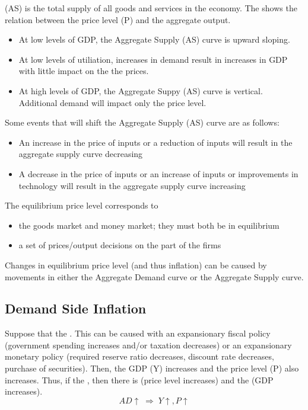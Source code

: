 \documentclass{article}
\begin{document}
 (AS) is the total supply of all goods and services in the economy. The  shows the relation between the price level (P) and the aggregate output. 
\begin{itemize}
  \item At low levels of GDP, the Aggregate Supply (AS) curve is upward sloping. 
  \item At low levels of utiliation, increases in demand result in increases in GDP with little impact on the the prices. 
  \item At high levels of GDP, the Aggregate Suppy (AS) curve is vertical. Additional demand will impact only the price level.
\end{itemize}
Some events that will shift the Aggregate Supply (AS) curve are as follows: 
\begin{itemize}
  \item An increase in the price of inputs or a reduction of inputs will result in the aggregate supply curve decreasing 
  \item A decrease in the price of inputs or an increase of inputs or improvements in technology will result in the aggregate supply curve increasing
\end{itemize}

\begin{remark}
  The equilibrium price level corresponds to 
  \begin{itemize}
    \item the goods market and money market; they must both be in equilibrium 
    \item a set of prices/output decisions on the part of the firms
  \end{itemize}
\end{remark}

Changes in equilibrium price level (and thus inflation) can be caused by movements in either the Aggregate Demand curve or the Aggregate Supply curve. 

\subsection{Demand Side Inflation}

Suppose that the . This can be caused with an expansionary fiscal policy (government spending increases and/or taxation decreases) or an expansionary monetary policy (required reserve ratio decreases, discount rate decreases, purchase of securities). Then, the GDP (Y) increases and the price level (P) also increases. Thus, if the , then there is  (price level increases) and the  (GDP increases). $$AD \uparrow \; \Rightarrow \; Y \uparrow , P \uparrow$$
\end{document}
